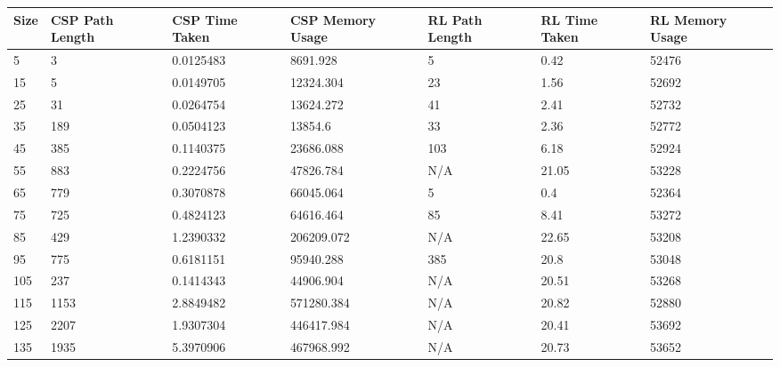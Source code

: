 \begin{tabular}{|l||l|l|l||l|l|l|}
\hline
Size & CSP Path Length & CSP Time Taken & CSP Memory Usage & RL Path Length & RL
Time Taken & RL Memory Usage \\ 
\hline \hline
5    & 3               & 0.0125483      & 8691.928         & 5              & 0.42          & 52476           \\ \hline
15   & 5               & 0.0149705      & 12324.304        & 23             & 1.56          & 52692           \\ \hline
25   & 31              & 0.0264754      & 13624.272        & 41             & 2.41          & 52732           \\ \hline
35   & 189             & 0.0504123      & 13854.6          & 33             & 2.36          & 52772           \\ \hline
45   & 385             & 0.1140375      & 23686.088        & 103            & 6.18          & 52924           \\ \hline
55   & 883             & 0.2224756      & 47826.784        & N/A            & 21.05         & 53228           \\ \hline
65   & 779             & 0.3070878      & 66045.064        & 5              & 0.4           & 52364           \\ \hline
75   & 725             & 0.4824123      & 64616.464        & 85             & 8.41          & 53272           \\ \hline
85   & 429             & 1.2390332      & 206209.072       & N/A            & 22.65         & 53208           \\ \hline
95   & 775             & 0.6181151      & 95940.288        & 385            & 20.8          & 53048           \\ \hline
105  & 237             & 0.1414343      & 44906.904        & N/A            & 20.51         & 53268           \\ \hline
115  & 1153            & 2.8849482      & 571280.384       & N/A            & 20.82         & 52880           \\ \hline
125  & 2207            & 1.9307304      & 446417.984       & N/A            & 20.41         & 53692           \\ \hline
135  & 1935            & 5.3970906      & 467968.992       & N/A            & 20.73         & 53652           \\ \hline

\end{tabular}
